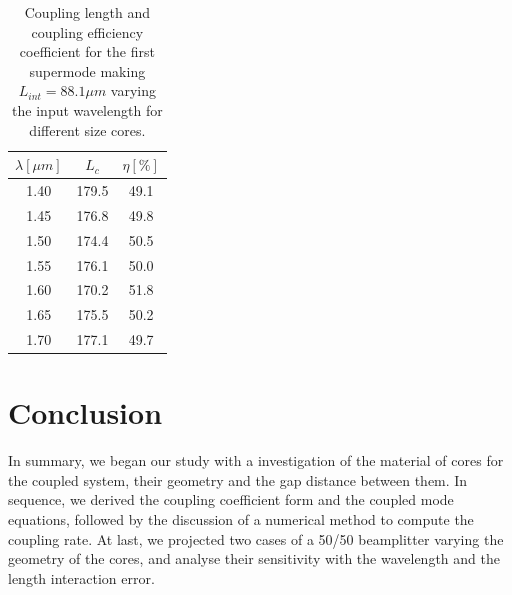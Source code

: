 \documentclass[conference, a4paper]{IEEEtran}
\begin{document}
\begin{table}[H]
    \centering
    \begin{tabular}{ccc}
        \toprule
        $\lambda [\mu m]$ & $L_c$ & $\eta[\%]$ \\
        \midrule
        1.40 & 179.5 & 49.1 \\
        1.45 & 176.8 & 49.8 \\
        1.50 & 174.4 & 50.5 \\
        1.55 & 176.1 & 50.0 \\
        1.60 & 170.2 & 51.8 \\
        1.65 & 175.5 & 50.2 \\
        1.70 & 177.1 & 49.7 \\    
        \bottomrule
    \end{tabular}
    \caption{Coupling length and coupling efficiency coefficient for the first supermode making $L_{int} = 88.1\mu m$ varying the input wavelength for different size cores.}
    \label{tab:splitter_doubled_lc}
\end{table}

\section{Conclusion}
\label{sec:conclusion}

In summary, we began our study with a investigation of the material of cores for the coupled system, their geometry and the gap distance between them. In sequence, we derived the coupling coefficient form and the coupled mode equations, followed by the discussion of a numerical method to compute the coupling rate. At last, we projected two cases of a 50/50 beamplitter varying the geometry of the cores, and analyse their sensitivity with the wavelength and the length interaction error.

% 
% 

\end{document}
